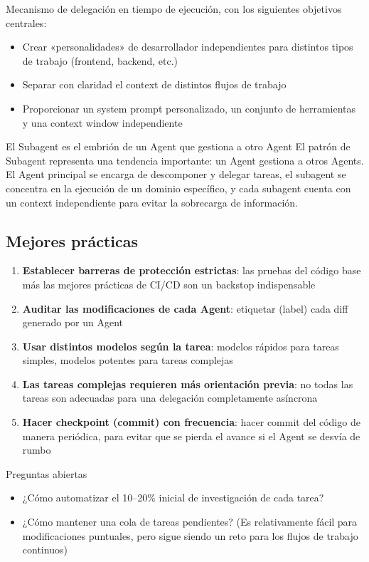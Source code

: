 Mecanismo de delegación en tiempo de ejecución, con los siguientes objetivos centrales:
\begin{itemize}
    \item Crear «personalidades» de desarrollador independientes para distintos tipos de trabajo (frontend, backend, etc.)
    \item Separar con claridad el context de distintos flujos de trabajo
    \item Proporcionar un system prompt personalizado, un conjunto de herramientas y una context window independiente
\end{itemize}

\begin{importantbox}{El Subagent es el embrión de un Agent que gestiona a otro Agent}
El patrón de Subagent representa una tendencia importante: un Agent gestiona a otros Agents. El Agent principal se encarga de descomponer y delegar tareas, el subagent se concentra en la ejecución de un dominio específico, y cada subagent cuenta con un context independiente para evitar la sobrecarga de información.
\end{importantbox}

\subsection{Mejores prácticas}

\begin{enumerate}
    \item \textbf{Establecer barreras de protección estrictas}: las pruebas del código base más las mejores prácticas de CI/CD son un backstop indispensable
    \item \textbf{Auditar las modificaciones de cada Agent}: etiquetar (label) cada diff generado por un Agent
    \item \textbf{Usar distintos modelos según la tarea}: modelos rápidos para tareas simples, modelos potentes para tareas complejas
    \item \textbf{Las tareas complejas requieren más orientación previa}: no todas las tareas son adecuadas para una delegación completamente asíncrona
    \item \textbf{Hacer checkpoint (commit) con frecuencia}: hacer commit del código de manera periódica, para evitar que se pierda el avance si el Agent se desvía de rumbo
\end{enumerate}

\begin{warningbox}{Preguntas abiertas}
\begin{itemize}
    \item ¿Cómo automatizar el 10--20\% inicial de investigación de cada tarea?
    \item ¿Cómo mantener una cola de tareas pendientes? (Es relativamente fácil para modificaciones puntuales, pero sigue siendo un reto para los flujos de trabajo continuos)
\end{itemize}
\end{warningbox}

